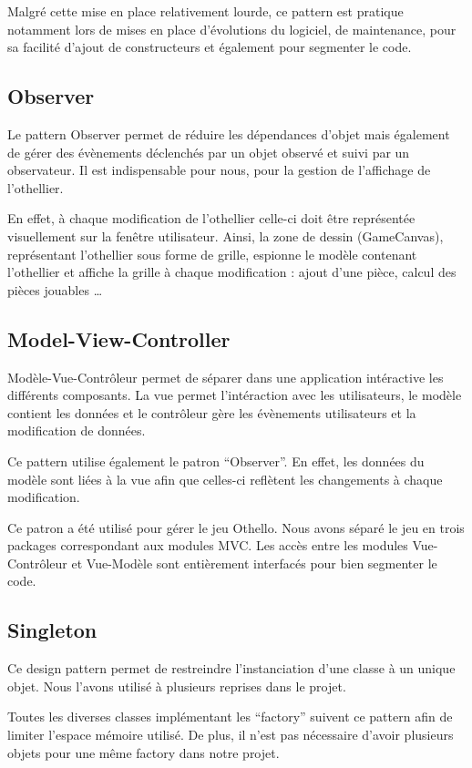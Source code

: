 \documentclass[a4paper,12pt]{report}
\begin{document}
Malgré cette mise en place relativement lourde, ce pattern est pratique notamment lors de mises en place d’évolutions du logiciel, de maintenance, pour sa facilité d’ajout de constructeurs et également pour segmenter le code.

\subsection{Observer}

Le pattern Observer permet de réduire les dépendances d’objet mais également de gérer des évènements déclenchés par un objet observé et suivi par un observateur. Il est indispensable pour nous, pour la gestion de l’affichage de l’othellier. 

En effet, à chaque modification de l’othellier celle-ci doit être représentée visuellement sur la fenêtre utilisateur. Ainsi, la zone de dessin (GameCanvas), représentant l’othellier sous forme de grille, espionne le modèle contenant l’othellier et affiche la grille à chaque modification : ajout d’une pièce, calcul des pièces jouables …

\subsection{Model-View-Controller}

Modèle-Vue-Contrôleur permet de séparer dans une application intéractive les différents composants. La vue permet l’intéraction avec les utilisateurs, le modèle contient les données et le contrôleur gère les évènements utilisateurs et la modification de données.

Ce pattern utilise également le patron “Observer”. En effet, les données du modèle sont liées à la vue afin que celles-ci reflètent les changements à chaque modification.

Ce patron a été utilisé pour gérer le jeu Othello. Nous avons séparé le jeu en trois packages correspondant aux modules MVC. Les accès entre les modules Vue-Contrôleur et Vue-Modèle sont entièrement interfacés pour bien segmenter le code. 

\subsection{Singleton}

Ce design pattern permet de restreindre l’instanciation d’une classe à un unique objet. Nous l’avons utilisé à plusieurs reprises dans le projet. 

Toutes les diverses classes implémentant les “factory” suivent ce pattern afin de limiter l’espace mémoire utilisé. De plus, il n’est pas nécessaire d’avoir plusieurs objets pour une même factory dans notre projet.
\end{document}

